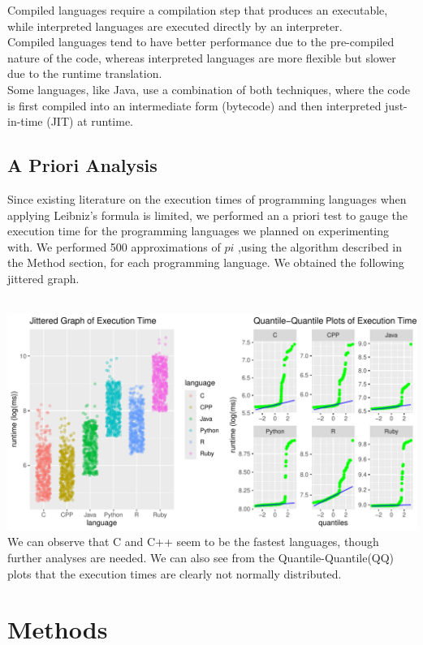 \documentclass[12pt,halfline,a4paper,]{ouparticle}
\begin{document}
Compiled languages require a compilation step that produces an
executable, while interpreted languages are executed directly by an
interpreter.\\
Compiled languages tend to have better performance due to the
pre-compiled nature of the code, whereas interpreted languages are more
flexible but slower due to the runtime translation.\\
Some languages, like Java, use a combination of both techniques, where
the code is first compiled into an intermediate form (bytecode) and then
interpreted just-in-time (JIT) at runtime.\\

\subsection{A Priori Analysis}\label{a-priori-analysis}

Since existing literature on the execution times of programming
languages when applying Leibniz's formula is limited, we performed an a
priori test to gauge the execution time for the programming languages we
planned on experimenting with. We performed 500 approximations of \(pi\)
,using the algorithm described in the Method section, for each
programming language. We obtained the following jittered graph.\\
\strut \\

\includegraphics[width=1\linewidth]{skeleton_files/figure-latex/figPrior-1}
We can observe that C and C++ seem to be the fastest languages, though
further analyses are needed. We can also see from the
Quantile-Quantile(QQ) plots that the execution times are clearly not
normally distributed.

\newpage

\section{Methods}\label{methods}
\end{document}
